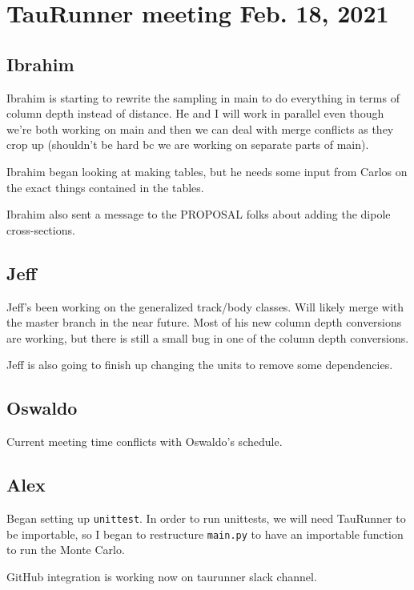 \chapter{TauRunner meeting Feb. 18, 2021}

\section{Ibrahim}
Ibrahim is starting to rewrite the sampling in main to do everything in terms of column depth instead of distance. He and I will work in parallel even though we're both working on main and then we can deal with merge conflicts as they crop up (shouldn't be hard bc we are working on separate parts of main).

Ibrahim began looking at making tables, but he needs some input from Carlos on the exact things contained in the tables.

Ibrahim also sent a message to the PROPOSAL folks about adding the dipole cross-sections.

\section{Jeff}
Jeff's been working on the generalized track/body classes. Will likely merge with the master branch in the near future. Most of his new column depth conversions are working, but there is still a small bug in one of the column depth conversions.

Jeff is also going to finish up changing the units to remove some dependencies.

\section{Oswaldo}
Current meeting time conflicts with Oswaldo's schedule. 

\section{Alex}
Began setting up \texttt{unittest}. In order to run unittests, we will need TauRunner to be importable, so I began to restructure \texttt{main.py} to have an importable function to run the Monte Carlo. 

GitHub integration is working now on taurunner slack channel.